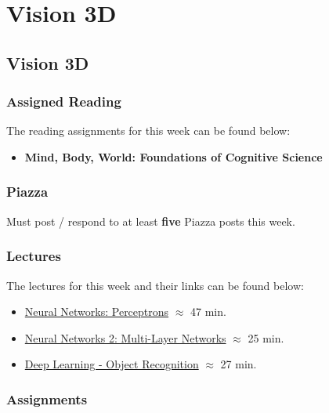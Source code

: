 \clearpage

\renewcommand{\ChapTitle}{Vision 3D}
\renewcommand{\SectionTitle}{Vision 3D}

\chapter{\ChapTitle}
\section{\SectionTitle}

\subsection{Assigned Reading}

The reading assignments for this week can be found below:

\begin{itemize}
    \item \textbf{Mind, Body, World: Foundations of Cognitive Science}
\end{itemize}

\subsection{Piazza}

Must post / respond to at least \textbf{five} Piazza posts this week.

\subsection{Lectures}

The lectures for this week and their links can be found below:

\begin{itemize}
    \item \href{https://www.youtube.com/watch?v=XAN8u7voWw0}{Neural Networks: Perceptrons} $\approx$ 47 min.
    \item \href{https://www.youtube.com/watch?v=zAXDn4zGXxs}{Neural Networks 2: Multi-Layer Networks} $\approx$ 25 min.
    \item \href{https://www.youtube.com/watch?v=zttSZyM8HPI}{Deep Learning - Object Recognition} $\approx$ 27 min.
\end{itemize}

\subsection{Assignments}

